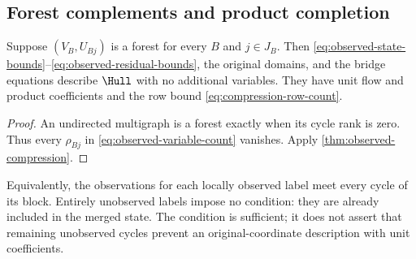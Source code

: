 \subsection{Forest complements and product completion}\label{subsec:forest-complements}
\begin{corollary}\label{cor:forest-hull}
Suppose $(V_B,U_{Bj})$ is a forest for every $B$ and $j\in J_B$.
Then \eqref{eq:observed-state-bounds}--\eqref{eq:observed-residual-bounds},
the original domains, and the bridge equations describe $\Hull$ with no
additional variables. They have unit flow and product coefficients and
the row bound \eqref{eq:compression-row-count}.
\end{corollary}
\begin{proof}
An undirected multigraph is a forest exactly when its cycle rank is zero.
Thus every $\rho_{Bj}$ in \eqref{eq:observed-variable-count} vanishes.
Apply \cref{thm:observed-compression}.
\end{proof}

Equivalently, the observations for each locally observed label meet every
cycle of its block. Entirely unobserved labels impose no condition: they
are already included in the merged state. The condition is sufficient;
it does not assert that remaining unobserved cycles prevent an
original-coordinate description with unit coefficients.

